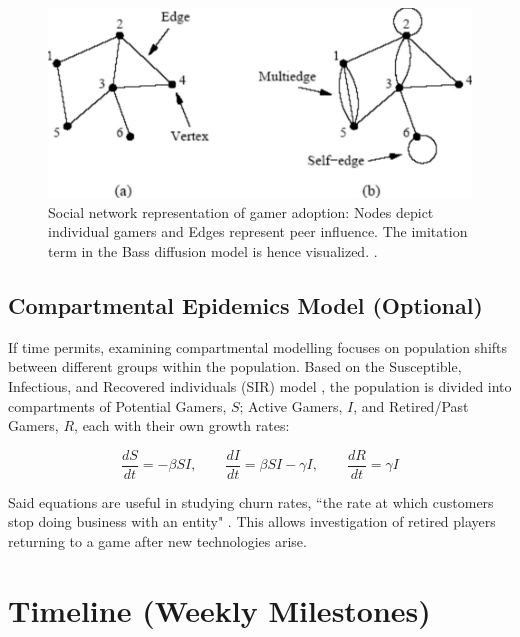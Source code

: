 \documentclass{article}
\begin{document}
\begin{figure} [H]
    \centering
    \includegraphics[width=0.5\linewidth]{Image.jpeg}
    \caption{Social network representation of gamer adoption: Nodes depict individual gamers and Edges represent peer influence. The imitation term in the Bass diffusion model is hence visualized. \cite{10.1093/acprof:oso/9780199206650.003.0006}.}
    \label{fig:GraphNodeFigure}
\end{figure}

\subsection{Compartmental Epidemics Model (Optional)}
If time permits, examining compartmental modelling focuses on population shifts between different groups within the population. Based on the Susceptible, Infectious, and Recovered individuals (SIR) model \cite{Hethcote2000Mathematics}, the population is divided into compartments of Potential Gamers, $S$; Active Gamers, $I$, and Retired/Past Gamers, $R$, each with their own growth rates:

\begin{equation}
\frac{dS}{dt} = -\beta S I, 
\qquad \frac{dI}{dt} = \beta S I - \gamma I, 
\qquad \frac{dR}{dt} = \gamma I
\end{equation}

\noindent Said equations are useful in studying churn rates, ``the rate at which customers stop doing business with an entity" \cite{INVESTOPEDIA2025CHURN}. This allows investigation of retired players returning to a game after new technologies arise.

\section{Timeline (Weekly Milestones)}
\end{document}
